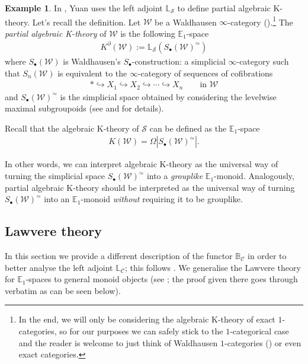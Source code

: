 \documentclass[12pt, reqno]{amsart}
\theoremstyle{plain}
\theoremstyle{definition}
\newtheorem{example}[theorem]{Example}
\begin{document}
\begin{example}
In \cite{Yuan}, Yuan uses the left adjoint $\mathbb{L}_\mathcal{S}$ to define partial algebraic K-theory. Let's recall the definition. Let $\mathcal{W}$ be a Waldhausen $\infty$-category (\cite{Barwick}).\footnote{In the end, we will only be considering the algebraic K-theory of exact $1$-categories, so for our purposes we can safely stick to the $1$-categorical case and the reader is welcome to just think of Waldhausen $1$-categories (\cite{Waldhausen}) or even exact categories.} The \textit{partial algebraic K-theory} of $\mathcal{W}$ is the following $\mathbb{E}_1$-space
\begin{align*}
K^\partial(\mathcal{W}):=\mathbb{L}_{\mathcal{S}}(S_\bullet(\mathcal{W})^{\simeq})
\end{align*}
where $S_\bullet(\mathcal{W})$ is Waldhausen's $S_\bullet$-construction: a simplicial $\infty$-category such that $S_n(\mathcal{W})$ is equivalent to the $\infty$-category of sequences of cofibrations
\begin{align*}
\ast\hookrightarrow X_1\hookrightarrow X_2\hookrightarrow \cdots \hookrightarrow X_n \qquad \text{in }\mathcal{W}
\end{align*}
and $S_\bullet(\mathcal{W})^\simeq$ is the simplicial space obtained by considering the levelwise maximal subgroupoids (see \cite{Barwick} and \cite{Waldhausen} for details).

Recall that the algebraic K-theory of $\mathcal{S}$ can be defined as the $\mathbb{E}_1$-space
\begin{align*}
K(\mathcal{W})=\Omega |S_\bullet(\mathcal{W})^\simeq|.
\end{align*}

In other words, we can interpret algebraic K-theory as the universal way of turning the simplicial space $S_\bullet(\mathcal{W})^\simeq$ into a \textit{grouplike} $\mathbb{E}_1$-monoid. Analogously, partial algebraic K-theory should be interpreted as the universal way of turning $S_\bullet(\mathcal{W})^\simeq$ into an $\mathbb{E}_1$-monoid \textit{without} requiring it to be grouplike.
\end{example}


\subsection{Lawvere theory}\label{Lawvere theory}

In this section we provide a different description of the functor $\mathbb{B}_{\mathcal{C}}$ in order to better analyse the left adjoint $\mathbb{L}_{\mathcal{C}}$; this follows \cite[\S 5.1]{Yuan}. We generalise the Lawvere theory for $\mathbb{E}_1$-spaces to general monoid objects (see \cite[Proposition 5.6]{Yuan}; the proof given there goes through verbatim as can be seen below).
\end{document}
